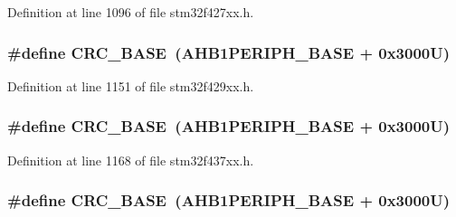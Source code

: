 Definition at line 1096 of file stm32f427xx.\+h.

\subsubsection[{\texorpdfstring{C\+R\+C\+\_\+\+B\+A\+SE}{CRC_BASE}}]{\setlength{\rightskip}{0pt plus 5cm}\#define C\+R\+C\+\_\+\+B\+A\+SE~({\bf A\+H\+B1\+P\+E\+R\+I\+P\+H\+\_\+\+B\+A\+SE} + 0x3000\+U)}\hypertarget{group___peripheral__memory__map_ga656a447589e785594cbf2f45c835ad7e}{}\label{group___peripheral__memory__map_ga656a447589e785594cbf2f45c835ad7e}


Definition at line 1151 of file stm32f429xx.\+h.

\subsubsection[{\texorpdfstring{C\+R\+C\+\_\+\+B\+A\+SE}{CRC_BASE}}]{\setlength{\rightskip}{0pt plus 5cm}\#define C\+R\+C\+\_\+\+B\+A\+SE~({\bf A\+H\+B1\+P\+E\+R\+I\+P\+H\+\_\+\+B\+A\+SE} + 0x3000\+U)}\hypertarget{group___peripheral__memory__map_ga656a447589e785594cbf2f45c835ad7e}{}\label{group___peripheral__memory__map_ga656a447589e785594cbf2f45c835ad7e}


Definition at line 1168 of file stm32f437xx.\+h.

\subsubsection[{\texorpdfstring{C\+R\+C\+\_\+\+B\+A\+SE}{CRC_BASE}}]{\setlength{\rightskip}{0pt plus 5cm}\#define C\+R\+C\+\_\+\+B\+A\+SE~({\bf A\+H\+B1\+P\+E\+R\+I\+P\+H\+\_\+\+B\+A\+SE} + 0x3000\+U)}\hypertarget{group___peripheral__memory__map_ga656a447589e785594cbf2f45c835ad7e}{}\label{group___peripheral__memory__map_ga656a447589e785594cbf2f45c835ad7e}


